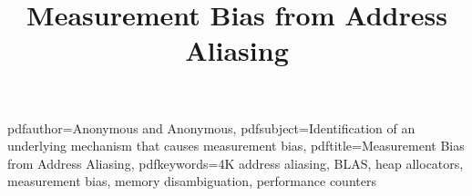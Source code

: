 \documentclass[10pt, conference, compsocconf]{IEEEtran}
\begin{document}
\hypersetup
{
    pdfauthor={Anonymous and Anonymous},
    pdfsubject={Identification of an underlying mechanism that causes measurement bias},
    pdftitle={Measurement Bias from Address Aliasing},
    pdfkeywords={4K address aliasing, BLAS, heap allocators, measurement bias, memory disambiguation, performance counters}
}



\title{Measurement Bias from Address Aliasing}

 
\iffalse
\author{
%
%

\alignauthor
Lars Kirkholt Melhus\\
       \affaddr{Norwegian University of Science and Technology}\\
       \affaddr{Sem Sælands vei 9}\\
       \affaddr{7491 Trondheim, Norway}\\
       \email{lars.kirkholt.melhus@gmail.com}
\alignauthor
Rune Erlend Jensen\\
       \affaddr{Norwegian University of Science and Technology}\\
       \affaddr{Sem Sælands vei 9}\\
       \affaddr{7491 Trondheim, Norway}\\
       \email{runeerle@idi.ntnu.no}

\alignauthor
Anonymous\\
       \affaddr{Anonymous University}\\
       \affaddr{Anonymous}\\
       \affaddr{Anonymous, Anonymous}\\
       \email{anonymous@anonymous.com}
\alignauthor
Anonymous\\
       \affaddr{Anonymous University }\\
       \affaddr{Anonymous}\\
       \affaddr{Anonymous, Anonymous}\\
       \email{anonymous@anonymous.com}
}
\fi
\end{document}
